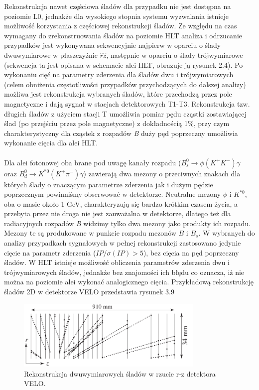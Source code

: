 \documentclass{pracamgr}
\begin{document}
Rekonstrukcja nawet częściowa śladów dla przypadku nie jest dostępna na poziomie L0, jednakże dla wysokiego stopnia systemu wyzwalania istnieje możliwość korzystania z częściowej rekonstrukcji śladów. Ze względu na czas wymagany do zrekonstruowania śladów na poziomie HLT analiza i odrzucanie przypadków jest wykonywana sekwencyjnie najpierw w oparciu o ślady dwuwymiarowe w płaszczyźnie $\hat{r}\hat{z}$, następnie w oparciu o ślady trójwymiarowe (sekwencja ta jest opisana w schemacie alei HLT, obrazuje ją rysunek 2.4). Po wykonaniu cięć na parametry zderzenia dla śladów dwu i trójwymiarowych (celem obniżenia częstotliwości przypadków przychodzących do dalszej analizy) możliwa jest rekonstrukcja wybranych śladów, które przechodzą przez pole magnetyczne i dają sygnał w stacjach detektorowych T1-T3. Rekonstrukcja tzw. długich śladów z użyciem stacji T umożliwia pomiar pędu cząstki zostawiającej ślad (po przejściu przez pole magnetyczne) z dokładnością 1\%, przy czym charakterystyczny dla cząstek z rozpadów \textit{B} duży pęd poprzeczny umożliwia wykonanie cięcia dla alei HLT.
\\\\
\noindent
Dla alei fotonowej oba brane pod uwagę kanały rozpadu ($B^{0}_{s}\rightarrow \phi(K^{+}K^{-})\gamma$ oraz $B^{0}_{d}\rightarrow K^{*0}(K^{+}\pi^{-})\gamma$) zawierają dwa mezony o przeciwnych znakach dla których ślady o znaczącym parametrze zderzenia jak i dużym pędzie poprzecznym powinniśmy obserwować w detektorze. Neutralne mezony $\phi$ i $K^{*0}$, oba o masie około 1 GeV, charakteryzują się bardzo krótkim czasem życia, a przebyta przez nie droga nie jest zauważalna w detektorze, dlatego też dla radiacyjnych rozpadów \textit{B} widzimy tylko dwa mezony jako produkty ich rozpadu. Mezony te są produkowane w punkcie rozpadu mezonów $B$ i $B_s$. W wybranych do analizy przypadkach sygnałowych w pełnej rekonstrukcji  zastosowano jedynie cięcie na parametr zderzenia ($IP/\sigma(IP) > 5$), bez cięcia na pęd poprzeczny śladów. W HLT istnieje możliwość obliczenia parametrów zderzenia dwu i trójwymiarowych śladów, jednakże bez znajomości ich błędu co oznacza, iż nie można na poziomie alei wykonać analogicznego cięcia. Przykładową rekonstrukcję śladów 2D w detektorze VELO przedstawia rysunek 3.9
\begin{figure}[!h]
 \centering
 \includegraphics[width=0.8\textwidth]{rysunki/2d.png}
 \caption{Rekonstrukcja dwuwymiarowych śladów w rzucie r-z detektora VELO.}
\end{figure}
\end{document}
